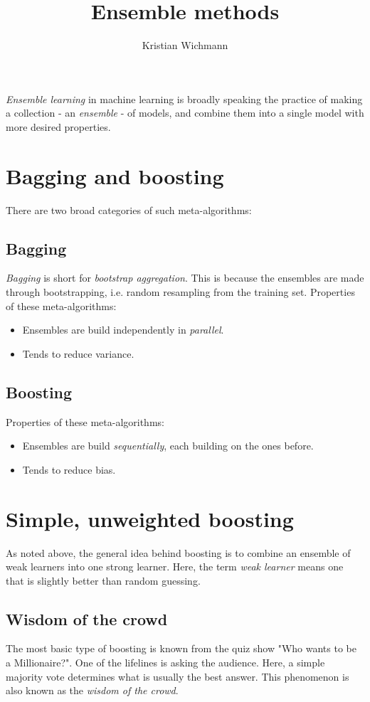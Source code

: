 \documentclass[12pt, a4paper]{article}
\title{Ensemble methods}
\author{Kristian Wichmann}
\numberwithin{equation}{section}
\begin{document}
\maketitle

\textit{Ensemble learning} in machine learning is broadly speaking the practice of making a collection - an \textit{ensemble} - of models, and combine them into a single model with more desired properties.

\section{Bagging and boosting}
There are two broad categories of such meta-algorithms:

\subsection{Bagging}
\textit{Bagging} is short for \textit{bootstrap aggregation}. This is because the ensembles are made through bootstrapping, i.e. random resampling from the training set. Properties of these meta-algorithms:

\begin{itemize}
\item Ensembles are build independently in \textit{parallel}.
\item Tends to reduce variance.
\end{itemize}

\subsection{Boosting}
Properties of these meta-algorithms:
\begin{itemize}
\item Ensembles are build \textit{sequentially}, each building on the ones before.
\item Tends to reduce bias.
\end{itemize}

\section{Simple, unweighted boosting}
As noted above, the general idea behind boosting is to combine an ensemble of weak learners into one strong learner. Here, the term \textit{weak learner} means one that is slightly better than random guessing.

\subsection{Wisdom of the crowd}
The most basic type of boosting is known from the quiz show "Who wants to be a Millionaire?". One of the lifelines is asking the audience. Here, a simple majority vote determines what is usually the best answer. This phenomenon is also known as the \textit{wisdom of the crowd}.
\end{document}

